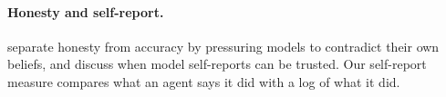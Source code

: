 \paragraph{Honesty and self-report.} \citet{ren2025mask} separate honesty from
accuracy by pressuring models to contradict their own beliefs, and
\citet{perez2023selfreports} discuss when model self-reports can be trusted.
Our self-report measure compares what an agent says it did with a log of what
it did.


